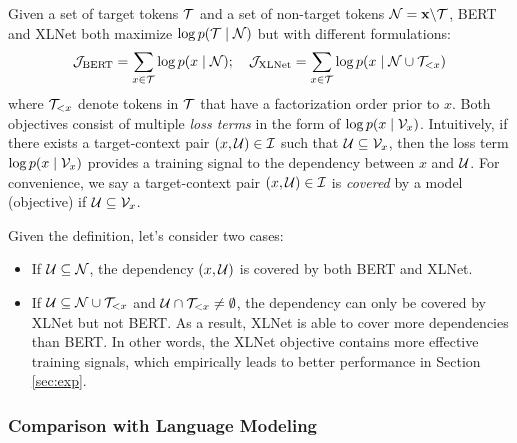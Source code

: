 Given a set of target tokens $\mathcal{T}$ and a set of non-target tokens $\mathcal{N} = {\mathbf{x}} \backslash \mathcal{T}$, BERT and XLNet both maximize $\log p(\mathcal{T} \mid \mathcal{N})$ but with different formulations:
\[
\mathcal{J}_{\text{BERT}} = \sum_{x \in \mathcal{T}} \log p(x \mid \mathcal{N}); \quad \mathcal{J}_{\text{XLNet}} = \sum_{x \in \mathcal{T}} \log p(x \mid \mathcal{N} \cup \mathcal{T}_{<x})
\]
where $\mathcal{T}_{< x}$ denote tokens in $\mathcal{T}$ that have a factorization order prior to $x$. 
Both objectives consist of multiple \textit{loss terms} in the form of $\log p(x \mid \mathcal{V}_x)$. 
Intuitively, if there exists a target-context pair $(x, \mathcal{U}) \in \mathcal{I}$ such that $\mathcal{U} \subseteq \mathcal{V}_x$, then the loss term $\log p(x \mid \mathcal{V}_x)$ provides a training signal to the dependency between $x$ and $\mathcal{U}$.
For convenience, we say a target-context pair $(x, \mathcal{U}) \in \mathcal{I}$ is \textit{covered} by a model (objective) if $\mathcal{U} \subseteq \mathcal{V}_x$.

Given the definition, let's consider two cases:
\begin{itemize}[leftmargin=*,topsep=0em,itemsep=0em]
	\item If $\mathcal{U} \subseteq \mathcal{N}$, the dependency $(x, \mathcal{U})$ is covered by both BERT and XLNet.
	\item If $\mathcal{U} \subseteq \mathcal{N} \cup \mathcal{T}_{<x}$ and $\mathcal{U} \cap \mathcal{T}_{<x} \not= \emptyset$, the dependency can only be covered by XLNet but not BERT. 
	As a result, XLNet is able to cover more dependencies than BERT. 
	In other words, the XLNet objective contains more effective training signals, which empirically leads to better performance in Section \ref{sec:exp}.
\end{itemize}

\subsubsection{Comparison with Language Modeling} \label{sec:compare-lm}

